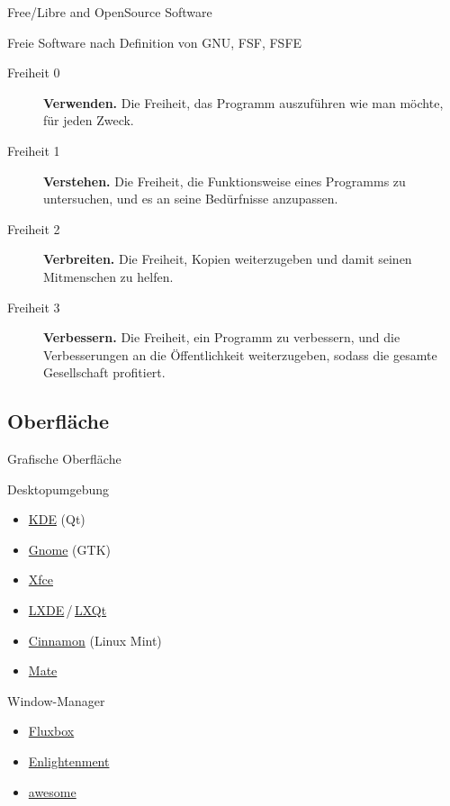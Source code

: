 \documentclass{beamer}
\makeatletter
\newcommand{\strong}[1]{\@strong{#1}}
\newcommand{\@@strong}[1]{\textbf{\let\@strong\@@@strong#1}}
\newcommand{\@@@strong}[1]{\textnormal{\let\@strong\@@strong#1}}
\let\@strong\@@strong
\makeatother
\begin{document}
\begin{frame}{Free/Libre and OpenSource Software}
    \begin{block}{Freie Software nach Definition von GNU, FSF, FSFE}
        \begin{description}
            \item[Freiheit 0] \strong{Verwenden.} {\small Die Freiheit,
                das Programm auszuführen wie man möchte, für jeden
                Zweck.}
            \item[Freiheit 1] \strong{Verstehen.} {\small Die Freiheit,
                die Funktionsweise eines Programms zu untersuchen, und
                es an seine Bedürfnisse anzupassen.}
            \item[Freiheit 2] \strong{Verbreiten.} {\small Die Freiheit,
                Kopien weiterzugeben und damit seinen Mitmenschen zu
                helfen.}
            \item[Freiheit 3] \strong{Verbessern.} {\small Die Freiheit,
                ein Programm zu verbessern, und die Verbesserungen
                an die Öffentlichkeit weiterzugeben, sodass die
                gesamte Gesellschaft profitiert.}
        \end{description}
    \end{block}
\end{frame}

\subsection{Oberfläche}

\begin{frame}{Grafische Oberfläche}
    \begin{block}{Desktopumgebung}
        \begin{itemize}
            \item \href{https://www.kde.org/}{KDE} (Qt)
            \item \href{https://www.gnome.org/}{Gnome} (GTK)
            \item \href{https://xfce.org/}{Xfce}
            \item
                \href{https://lxde.org/}{LXDE}\,/\,\href{https://lxqt.org/}{LXQt}
            \item \href{https://github.com/linuxmint/Cinnamon}{Cinnamon}
                (Linux Mint)
            \item \href{http://mate-desktop.org/}{Mate}
        \end{itemize}
    \end{block}
    \pause
    \begin{block}{Window-Manager}
        \begin{itemize}
            \item \href{http://fluxbox.org/}{Fluxbox}
            \item \href{https://www.enlightenment.org/}{Enlightenment}
            \item \href{https://awesomewm.org/}{awesome}
        \end{itemize}
    \end{block}
\end{frame}
\end{document}
